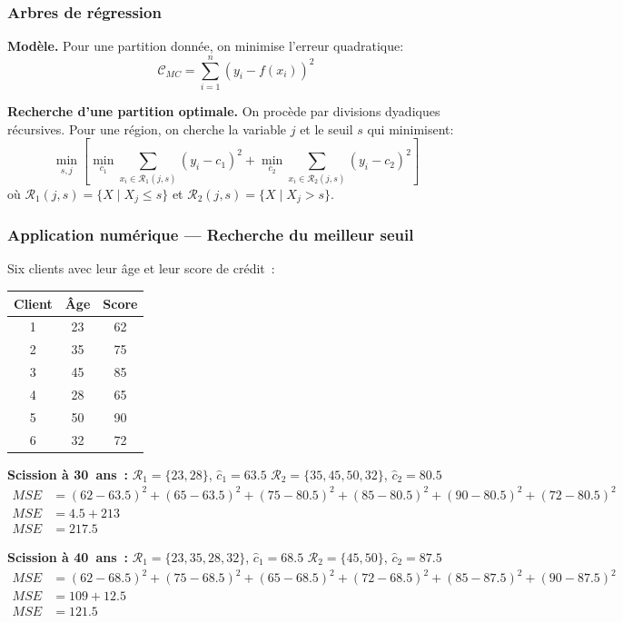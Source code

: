 \documentclass[a4paper,12pt]{article}
\begin{document}
\subsubsection{Arbres de régression}
\textbf{Modèle.} Pour une partition donnée, on minimise l'erreur quadratique:
\[
\mathcal{C}_{MC} = \sum_{i=1}^{n} (y_i - f(x_i))^2
\]

\textbf{Recherche d'une partition optimale.} On procède par divisions dyadiques récursives. Pour une région, on cherche la variable $j$ et le seuil $s$ qui minimisent:
\[
\min_{s,j} \left[ \min_{c_1} \sum_{x_i \in \mathcal{R}_1(j,s)} (y_i - c_1)^2 + \min_{c_2} \sum_{x_i \in \mathcal{R}_2(j,s)} (y_i - c_2)^2 \right]
\]
où $\mathcal{R}_1(j,s) = \{X \mid X_j \leq s\}$ et $\mathcal{R}_2(j,s) = \{X \mid X_j > s\}$.

\subsubsection*{Application numérique — Recherche du meilleur seuil}
Six clients avec leur âge et leur score de crédit~:

\begin{center}
\begin{tabular}{ccc}
\toprule
Client & Âge & Score \\
\midrule
1 & 23 & 62 \\
2 & 35 & 75 \\
3 & 45 & 85 \\
4 & 28 & 65 \\
5 & 50 & 90 \\
6 & 32 & 72 \\
\bottomrule
\end{tabular}
\end{center}

\noindent\textbf{Scission à 30~ans~:} $\mathcal{R}_1=\{23,28\}$, $\hat{c}_1=63.5$ \quad
$\mathcal{R}_2=\{35,45,50,32\}$, $\hat{c}_2=80.5$
\begin{align*}
MSE &= (62-63.5)^2 + (65-63.5)^2 + (75-80.5)^2 + (85-80.5)^2 + (90-80.5)^2 + (72-80.5)^2 \\
MSE &= 4.5+213 \\
MSE &= 217.5
\end{align*}

\noindent\textbf{Scission à 40~ans~:} $\mathcal{R}_1=\{23,35,28,32\}$, $\hat{c}_1=68.5$ \quad
$\mathcal{R}_2=\{45,50\}$, $\hat{c}_2=87.5$
\begin{align*}
  MSE &= (62-68.5)^2 + (75-68.5)^2 + (65-68.5)^2 + (72-68.5)^2 + (85-87.5)^2 + (90-87.5)^2 \\
  MSE &= 109+12.5 \\
  MSE &= 121.5
\end{align*}
\end{document}
